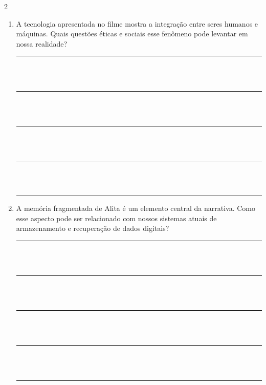 \documentclass[11pt]{article}
\begin{document}
\begin{multicols}{2}
\begin{enumerate}[leftmargin=*, label=\arabic*., series=questoes]
\vspace{0.5cm}
\noindent\rule{\linewidth}{0.4pt}\\
\vspace{0.1cm}\\
\noindent\rule{\linewidth}{0.4pt}\\
\vspace{0.1cm}\\
\noindent\rule{\linewidth}{0.4pt}\\
\vspace{0.1cm}\\
\noindent\rule{\linewidth}{0.4pt}\\
\vspace{0.1cm}\\
\noindent\rule{\linewidth}{0.4pt}

\item A tecnologia apresentada no filme mostra a integração entre seres humanos e máquinas. Quais questões éticas e sociais esse fenômeno pode levantar em nossa realidade?

\vspace{0.5cm}
\noindent\rule{\linewidth}{0.4pt}\\
\vspace{0.1cm}\\
\noindent\rule{\linewidth}{0.4pt}\\
\vspace{0.1cm}\\
\noindent\rule{\linewidth}{0.4pt}\\
\vspace{0.1cm}\\
\noindent\rule{\linewidth}{0.4pt}\\
\vspace{0.1cm}\\
\noindent\rule{\linewidth}{0.4pt}

\item A memória fragmentada de Alita é um elemento central da narrativa. Como esse aspecto pode ser relacionado com nossos sistemas atuais de armazenamento e recuperação de dados digitais?

\vspace{0.5cm}
\noindent\rule{\linewidth}{0.4pt}\\
\vspace{0.1cm}\\
\noindent\rule{\linewidth}{0.4pt}\\
\vspace{0.1cm}\\
\noindent\rule{\linewidth}{0.4pt}\\
\vspace{0.1cm}\\
\noindent\rule{\linewidth}{0.4pt}\\
\vspace{0.1cm}\\
\noindent\rule{\linewidth}{0.4pt}


\end{enumerate}
\end{multicols}
\end{document}
